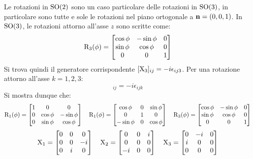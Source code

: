 Le rotazioni in $ \mathrm{SO}(2) $ sono un caso particolare delle rotazioni in $ \mathrm{SO}(3) $, in particolare sono tutte e sole le rotazioni nel piano ortogonale a $ \mathbf{n} = (0,0,1) $. In $ \mathrm{SO}(3) $, le rotazioni attorno all'asse $ z $ sono scritte come:
\begin{equation*}
	\mathrm{R}_3(\phi) =
	\begin{bmatrix}
		\cos \phi & -\sin \phi & 0 \\
		\sin \phi & \cos \phi & 0 \\
		0 & 0 & 1
	\end{bmatrix}
\end{equation*}
Si trova quindi il generatore corrispondente $ [\mathrm{X}_3]_{ij} = -i \epsilon_{ij3} $. Per una rotazione attorno all'asse $ k = 1,2,3 $:
\begin{equation}
	[\tens{X}_k]_{ij} = -i \epsilon_{ijk}
	\label{eq:9.10}
\end{equation}
Si mostra dunque che:
\begin{equation*}
	\mathrm{R}_1(\phi) =
	\begin{bmatrix}
		1 & 0 & 0 \\
		0 & \cos \phi & -\sin \phi \\
		0 & \sin \phi & \cos \phi
	\end{bmatrix}
	\quad
	\mathrm{R}_1(\phi) =
	\begin{bmatrix}
		\cos \phi & 0 & \sin \phi \\
		0 & 1 & 0 \\
		-\sin \phi & 0 & \cos \phi
	\end{bmatrix}
	\quad
	\mathrm{R}_3(\phi) =
	\begin{bmatrix}
		\cos \phi & -\sin \phi & 0 \\
		\sin \phi & \cos \phi & 0 \\
		0 & 0 & 1
	\end{bmatrix}
\end{equation*}
\begin{equation*}
	\mathrm{X}_1 =
	\begin{bmatrix}
		0 & 0 & 0 \\
		0 & 0 & -i \\
		0 & i & 0
	\end{bmatrix}
	\quad
	\mathrm{X}_2 =
	\begin{bmatrix}
		0 & 0 & i \\
		0 & 0 & 0 \\
		-i & 0 & 0
	\end{bmatrix}
	\quad
	\mathrm{X}_3 =
	\begin{bmatrix}
		0 & -i & 0 \\
		i & 0 & 0 \\
		0 & 0 & 0
	\end{bmatrix}
\end{equation*}

